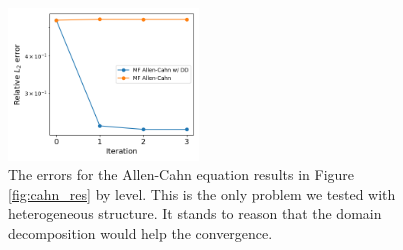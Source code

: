 \documentclass[12pt]{article}
\begin{document}

\begin{figure}[H]
\centering
\includegraphics[width=0.45\textwidth]{imgs/cahn_errors}
\caption{The errors for the Allen-Cahn equation results in Figure \ref{fig:cahn_res} by level. This is the only problem we tested with heterogeneous structure. It stands to reason that the domain decomposition would help the convergence.}
\end{figure}
\end{document}
